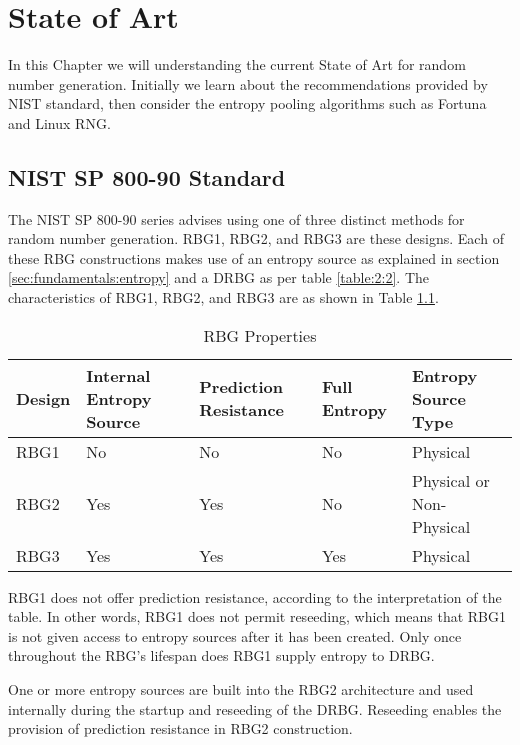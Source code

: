\chapter{State of Art}
\label{ch:SoA}

In this Chapter we will understanding the current State of Art for random number generation. Initially we learn about the recommendations provided by NIST standard, then consider the entropy pooling algorithms such as Fortuna and Linux RNG.

%
%
\section{NIST SP 800-90 Standard}
\label{sec:SoA:NIST}

The NIST SP 800-90 series advises using one of three distinct methods for random number generation. RBG1, RBG2, and RBG3 are these designs. Each of these RBG constructions makes use of an entropy source as explained in section \ref{sec:fundamentals:entropy} and a DRBG as per table \ref{table:2:2}. The characteristics of RBG1, RBG2, and RBG3 are as shown in Table \ref{table:3:1}.

\begin{table}[htbp]
	\centering
	\label{table:3:1}
	\begin{tabular}{||p{2cm} p{2cm} p{2cm} p{2.5cm} p{2.5cm}||}
		\hline
		Design & Internal Entropy Source & Prediction Resistance & Full Entropy & Entropy Source Type
		\\ [0.3ex] 
		\hline\hline
		RBG1 & No & No & No & Physical \\
		RBG2 & Yes & Yes & No & Physical or Non-Physical\\
		RBG3 & Yes & Yes & Yes & Physical \\
		\hline
	\end{tabular}
	\caption{RBG Properties}
\end{table}

RBG1 does not offer prediction resistance, according to the interpretation of the table. In other words, RBG1 does not permit reseeding, which means that RBG1 is not given access to entropy sources after it has been created. Only once throughout the RBG's lifespan does RBG1 supply entropy to DRBG.

One or more entropy sources are built into the RBG2 architecture and used internally during the startup and reseeding of the DRBG. Reseeding enables the provision of prediction resistance in RBG2 construction.

